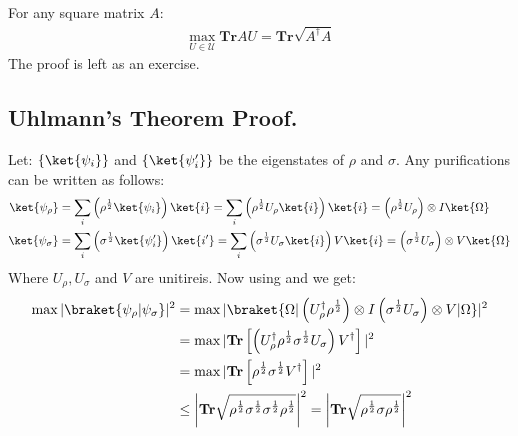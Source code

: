 \documentclass[12pt,a4paper]{article}
\begin{document}
\begin{claim} For any square matrix $A$:
  \label{claim:AB}
  \begin{equation*}
    \begin{split}
      \max_{U \in \mathcal{U}} \mathbf{Tr} AU = \mathbf{Tr} \sqrt{ A^\dagger A } 
    \end{split}
  \end{equation*}
The proof is left as an exercise.
\end{claim}

\subsection{Uhlmann's Theorem Proof.} 

Let: $\{\ket{\psi_i}\}$ and $\{\ket{\psi_i^\prime}\}$ be the eigenstates of $\rho$ and $\sigma$. Any purifications can be written as follows:
\begin{equation*}
  \begin{split}
    \ket{\psi_\rho} & = \sum_{i}{ \left( \rho^{\frac{1}{2}}\ket{\psi_i} \right) \ket{i} } = \sum_{i}{ \left( \rho^{\frac{1}{2}} U_{\rho} \ket{i} \right) \ket{i} }  =  \left( \rho^{\frac{1}{2}} U_{\rho} \right) \otimes I \ket{ \Omega } \\ 
  \ket{\psi_\sigma} & = \sum_{i}{ \left( \sigma^{\frac{1}{2}}\ket{\psi^\prime_i} \right) \ket{i^\prime} } =  
  \sum_{i}{ \left( \sigma^{\frac{1}{2}} U_{\sigma} \ket{i} \right)  V \ket{i} }  =  \left( \sigma^{\frac{1}{2}} U_{\sigma} \right) \otimes V \ket{\Omega} 
  \end{split}
\end{equation*}
Where $U_{\rho},U_{\sigma}$ and $V$ are unitireis. Now using  and  we get:
\begin{equation*}
  \begin{split}
    \max | \braket{ \psi_\rho | \psi_\sigma } |^2  & = \max  | \braket{\Omega |   \left( U_{\rho}^{\dagger} \rho^{\frac{1}{2}}  \right) \otimes I   \left( \sigma^{\frac{1}{2}} U_{\sigma} \right) \otimes V     | \Omega}  |^{2} \\
  & = \max |     \mathbf{Tr} \left[  \left( U_{\rho}^{\dagger} \rho^{\frac{1}{2}}   \sigma^{\frac{1}{2}} U_{\sigma} \right)  V^\dagger\right]    |^{2} \\
  & = \max |     \mathbf{Tr} \left[  \rho^{\frac{1}{2}}   \sigma^{\frac{1}{2}}   V^\dagger\right]    |^{2} \\
  & \le \left|   \mathbf{Tr} \sqrt{      \rho^{\frac{1}{2}} \sigma^{\frac{1}{2}} \sigma^{\frac{1}{2}}\rho^{\frac{1}{2}}   }   \right|^{2} = \left|   \mathbf{Tr} \sqrt{      \rho^{\frac{1}{2}} \sigma \rho^{\frac{1}{2}}   }   \right|^{2}  \\
  \end{split}
\end{equation*}
\end{document}
